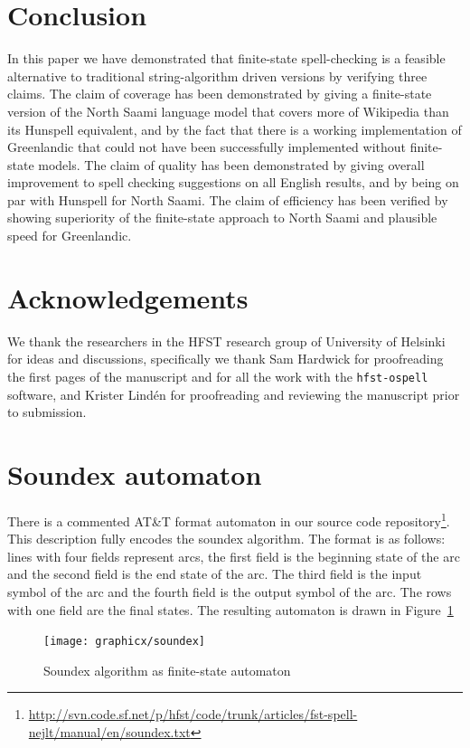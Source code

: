 \documentclass[a4paper,12pt]{article}
\begin{document}
\section{Conclusion}
\label{sec:conclusion}

In this paper we have demonstrated that finite-state spell-checking is a
feasible alternative to traditional string-algorithm driven versions by
verifying three claims. The claim of coverage has been demonstrated by giving a
finite-state version of the North Saami language model that covers more of
Wikipedia than its Hunspell equivalent, and by the fact that there is a working
implementation of Greenlandic that could not have been successfully implemented
without finite-state models. The claim of quality has been demonstrated by
giving overall improvement to spell checking suggestions on all English
results, and by being on par with Hunspell for North Saami. The claim of
efficiency has been verified by showing superiority of the finite-state
approach to North Saami and plausible speed for Greenlandic.

\section*{Acknowledgements}

We thank the researchers in the HFST research group of University of Helsinki
for ideas and discussions, specifically we thank Sam Hardwick for proofreading
the first pages of the manuscript and for all the work with the 
\texttt{hfst-ospell} software, and Krister Lindén for proofreading and 
reviewing the manuscript prior to submission.



\section*{Soundex automaton}
\label{appendix:soundex}

There is a commented AT\&T format automaton in our source code
repository\footnote{\url{http://svn.code.sf.net/p/hfst/code/trunk/articles/fst-spell-nejlt/manual/en/soundex.txt}}.
This description fully encodes the soundex algorithm.  The format is as
follows: lines with four fields represent arcs, the first field is the
beginning state of the arc and the second field is the end state of the arc.
The third field is the input symbol of the arc and the fourth field is the
output symbol of the arc. The rows with one field are the final states. The
resulting automaton is drawn in Figure~\ref{fig:soundex}

\begin{figure}
    \centering
    \texttt{[image: graphicx/soundex]}
    \caption{Soundex algorithm as finite-state automaton
    \label{fig:soundex}}
\end{figure}
\end{document}
